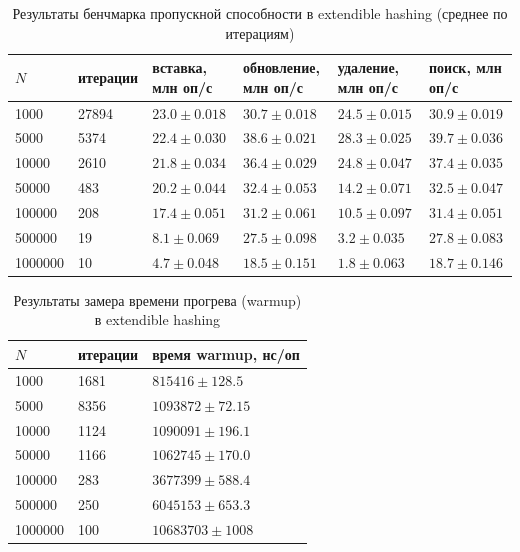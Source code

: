 \documentclass{itmo}
\begin{document}
\begin{table}[H]
	\centering
	\caption{Результаты бенчмарка пропускной способности в extendible hashing (среднее по итерациям)}
	\label{tab:extendible-throughput}
	\begin{tabularx}{\textwidth}{|X|X|X|X|X|X|}
		\toprule
		$N$ & итерации & вставка, млн оп/с & обновление, млн оп/с & удаление, млн оп/с & поиск, млн оп/с \\
		\midrule
		1000 & 27894 & $23.0 \pm 0.018$ & $30.7 \pm 0.018$ & $24.5 \pm 0.015$ & $30.9 \pm 0.019$ \\
		5000 & 5374 & $22.4 \pm 0.030$ & $38.6 \pm 0.021$ & $28.3 \pm 0.025$ & $39.7 \pm 0.036$ \\
		10000 & 2610 & $21.8 \pm 0.034$ & $36.4 \pm 0.029$ & $24.8 \pm 0.047$ & $37.4 \pm 0.035$ \\
		50000 & 483 & $20.2 \pm 0.044$ & $32.4 \pm 0.053$ & $14.2 \pm 0.071$ & $32.5 \pm 0.047$ \\
		100000 & 208 & $17.4 \pm 0.051$ & $31.2 \pm 0.061$ & $10.5 \pm 0.097$ & $31.4 \pm 0.051$ \\
		500000 & 19 & $8.1 \pm 0.069$ & $27.5 \pm 0.098$ & $3.2 \pm 0.035$ & $27.8 \pm 0.083$ \\
		1000000 & 10 & $4.7 \pm 0.048$ & $18.5 \pm 0.151$ & $1.8 \pm 0.063$ & $18.7 \pm 0.146$ \\
		\bottomrule
	\end{tabularx}
\end{table}

\begin{table}[H]
	\centering
	\caption{Результаты замера времени прогрева (warmup) в extendible hashing}
	\label{tab:extendible-warmup}
	\begin{tabularx}{\textwidth}{|X|X|X|}
		\toprule
		$N$ & итерации & время warmup, нс/оп \\
		\midrule
		1000 & 1681 & $815416 \pm 128.5$ \\
		5000 & 8356 & $1093872 \pm 72.15$ \\
		10000 & 1124 & $1090091 \pm 196.1$ \\
		50000 & 1166 & $1062745 \pm 170.0$ \\
		100000 & 283 & $3677399 \pm 588.4$ \\
		500000 & 250 & $6045153 \pm 653.3$ \\
		1000000 & 100 & $10683703 \pm 1008$ \\
		\bottomrule
	\end{tabularx}
\end{table}
\end{document}
